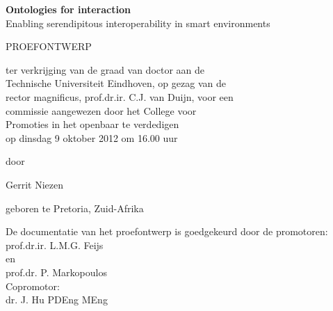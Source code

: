 
\begin{titlepage}
	\begin{addmargin}[-1cm]{-3cm}
	\begin{center}
		
\newlength{\drop}

\textheight 
\vspace*{\drop} 

{\LARGE \bfseries Ontologies for interaction}\\[1\baselineskip] 
{\Large\sffamily Enabling serendipitous interoperability in smart environments}\par 
\vfill
{\LARGE PROEFONTWERP}\par 
\vspace{\drop} 
{\large ter verkrijging van de graad van doctor aan de\\
Technische Universiteit Eindhoven, op gezag van de\\
rector magnificus, prof.dr.ir. C.J. van Duijn, voor een\\ 
commissie aangewezen door het College voor\\ 
Promoties in het openbaar te verdedigen\\
op dinsdag 9 oktober 2012 om 16.00 uur}\par
\vfill 
{\large door}\par
\vspace*{0.7\drop}
{\large Gerrit Niezen}\par 
\vspace*{0.7\drop} 
{\large geboren te Pretoria, Zuid-Afrika}\par
\end{center}
\end{addmargin}
\end{titlepage}

\newpage
\thispagestyle{empty}
\begin{addmargin}[-1cm]{-3cm}
{\noindent De documentatie van het proefontwerp is goedgekeurd door de promotoren:}\\

{\noindent prof.dr.ir. L.M.G. Feijs}\\
en\\
prof.dr. P. Markopoulos\\

{\noindent Copromotor:}\\
dr. J. Hu PDEng MEng\\
\end{addmargin}
